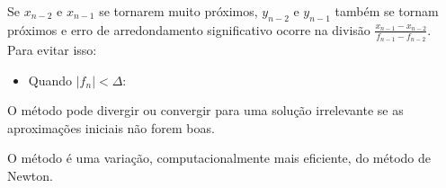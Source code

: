 \begin{enumerar}
 \item Se $x_{n-2}$ e $x_{n-1}$ se tornarem muito próximos, $y_{n-2}$ e $y_{n-1}$ também se tornam próximos e erro de arredondamento significativo ocorre na divisão $ \displaystyle \frac{x_{n-1} - x_{n-2}}{f_{n-1} - f_{n-2}} $. Para evitar isso:

\begin{itemize}
 \item Quando $ |f_{n}| < \Delta$:


\end{itemize}

 \item O método pode divergir ou convergir para uma solução irrelevante se as aproximações iniciais não forem boas.

 \item O método é uma variação, computacionalmente mais eficiente, do método de Newton.

 \end{enumerar}

